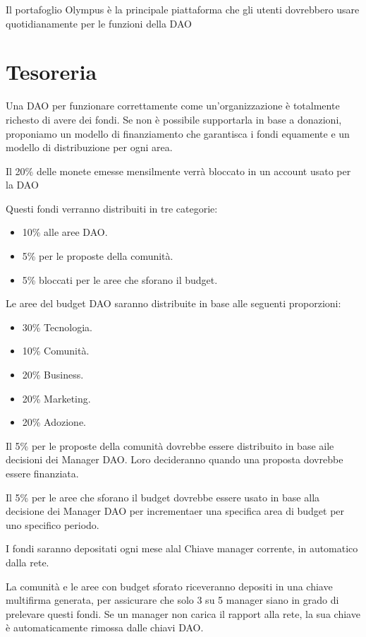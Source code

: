 \documentclass{article}
\begin{document}
Il portafoglio Olympus è la principale piattaforma che gli utenti dovrebbero usare quotidianamente per le funzioni della DAO 

\section{Tesoreria}

Una DAO per funzionare correttamente come un'organizzazione è totalmente richesto di avere dei fondi. Se non è possibile supportarla in base a donazioni, proponiamo un modello di finanziamento che garantisca i fondi equamente e un modello di distribuzione per ogni area. 

Il 20\% delle monete emesse mensilmente verrà bloccato in un account usato per la DAO

Questi fondi verranno distribuiti in tre categorie:

\begin{itemize}
  \item 10\% alle aree DAO.
  \item 5\% per le proposte della comunità.
  \item 5\% bloccati per le aree che sforano il budget.
\end{itemize}

Le aree del budget DAO saranno distribuite in base alle seguenti proporzioni:

\begin{itemize}
  \item 30\% Tecnologia.
  \item 10\% Comunità.
  \item 20\% Business.
  \item 20\% Marketing.
  \item 20\% Adozione.
\end{itemize}

Il 5\% per le proposte della comunità dovrebbe essere distribuito in base aile decisioni dei Manager DAO. Loro decideranno quando una proposta dovrebbe essere finanziata.

Il 5\% per le aree che sforano il budget dovrebbe essere usato in base alla decisione dei Manager DAO per incrementaer una specifica area di budget per uno specifico periodo.

I fondi saranno depositati ogni mese alal Chiave manager corrente, in automatico dalla rete.

La comunità e le aree con budget sforato riceveranno depositi in una chiave multifirma generata, per assicurare che solo 3 su 5 manager siano in grado di prelevare questi fondi.
Se un manager non carica il rapport alla rete, la sua chiave è automaticamente rimossa dalle chiavi DAO.
\end{document}
